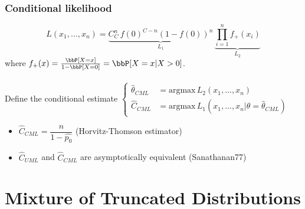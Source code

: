 \documentclass{beamer}
\begin{document}
\begin{frame}\frametitle{Conditional likelihood}
 \[ L(x_1,\ldots, x_n) = \underbrace{C_C^n \, f(0)^{C-n} (1-f(0))^n}_{L_1} \, 
                         \underbrace{\prod_{i=1}^{n} f_+(x_i) }_{L_2} \]
where $f_+(x) = \frac{\bbP[X=x]}{1-\bbP[X=0]} = \bbP[X = x | X > 0]$. \\
\hfill \\
Define the conditional estimate
$
\begin{cases}
 \hat \theta_{CML} & = \text{argmax} \, L_2(x_1,\ldots,x_n) \\
 \hat C_{CML} & = \text{argmax} \, L_1(x_1,\ldots,x_n | \theta = \hat \theta_{CML})
\end{cases}
$

\begin{theorem}
\begin{itemize}
 \item $\hat C_{CML} = \dfrac{n}{1 - \hat {p_0} }$ (Horvitz-Thomson estimator)
 \item $\hat C_{UML}$ and $\hat C_{CML}$ are asymptotically equivalent (Sanathanan77)
\end{itemize}
\end{theorem}
\end{frame}

\section{Mixture of Truncated Distributions}
\subsection*{}
\end{document}
